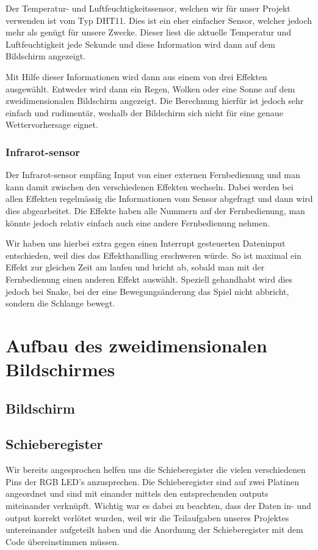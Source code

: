 \documentclass[12pt,a4paper]{article}
\begin{document}
Der Temperatur- und Luftfeuchtigkeitssensor, welchen wir für unser Projekt verwenden ist vom Typ DHT11. Dies ist ein eher einfacher Sensor, welcher jedoch mehr als genügt für unsere Zwecke. Dieser liest die aktuelle Temperatur und Luftfeuchtigkeit jede Sekunde und diese Information wird dann auf dem Bildschirm angezeigt. 

Mit Hilfe dieser Informationen wird dann aus einem von drei Effekten ausgewählt. Entweder wird dann ein Regen, Wolken oder eine Sonne auf dem zweidimensionalen Bildschirm angezeigt. Die Berechnung hierfür ist jedoch sehr einfach und rudimentär, weshalb der Bildschirm sich nicht für eine genaue Wettervorhersage eignet. 

\subsubsection{Infrarot-sensor}

Der Infrarot-sensor empfäng Input von einer externen Fernbedienung und man kann damit zwischen den verschiedenen Effekten wechseln. Dabei werden bei allen Effekten regelmässig die Informationen vom Sensor abgefragt und dann wird dies abgearbeitet. Die Effekte haben alle Nummern auf der Fernbedienung, man könnte jedoch relativ einfach auch eine andere Fernbedienung nehmen.

Wir haben uns hierbei extra gegen einen Interrupt gesteuerten Dateninput entschieden, weil dies das Effekthandling erschweren würde. So ist maximal ein Effekt zur gleichen Zeit am laufen und bricht ab, sobald man mit der Fernbedienung einen anderen Effekt auswählt. Speziell gehandhabt wird dies jedoch bei Snake, bei der eine Bewegungsänderung das Spiel nicht abbricht, sondern die Schlange bewegt.
\newpage
\section{Aufbau des zweidimensionalen Bildschirmes}

\subsection{Bildschirm}

\subsection{Schieberegister}

Wir bereits angesprochen helfen uns die Schieberegister die vielen verschiedenen Pins der RGB LED's anzusprechen. Die Schieberegister sind auf zwei Platinen angeordnet und sind mit einander mittels den entsprechenden outputs miteinander verknüpft. Wichtig war es dabei zu beachten, dass der Daten in- und output korrekt verlötet wurden, weil wir die Teilaufgaben unseres Projektes untereinander aufgeteilt haben und die Anordnung der Schieberegister mit dem Code übereinstimmen müssen.
\end{document}

